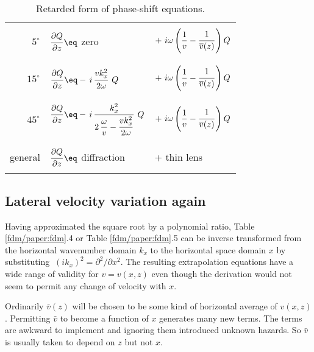 {\begin{table}
\begin{center}
\begin{tabular}{|r|ll|}
     &     &  \\
$5^\circ$ & $\displaystyle {\strut\partial Q\over
             \partial z} \eq $ zero
& $+\ i\omega \left( \displaystyle {1\over v} - 
  {\strut 1\over\overline{v}(z)} \right) Q$ \\
     &     &   \\   \hline
     &     &   \\
$15^\circ$ & $\displaystyle {\strut\partial Q\over
             \partial z} \eq - \,i\, {\displaystyle 
             {\strut v k_x^2\over 2\omega}} \ Q$ 
& $+\ i\omega \left( \displaystyle {1\over v} - 
  {\strut 1\over\overline{v}(z)} \right) Q$    \\
     &     &   \\      \hline
     &     &   \\
$45^\circ$ & $\displaystyle {\strut\partial Q\over
             \partial z} \eq - \,i\, {\displaystyle 
             {\strut k_x^2}\over\displaystyle 
             {2\,{\omega\over v} - {\strut v k_x^2
             \over 2\omega}}} \ Q$ 
& $+\ i\omega \left(\displaystyle {1\over v} - 
  {\strut 1\over\overline{v}(z)} \right) Q$ \\
     &     &   \\       \hline
     &     &   \\       
{\rm general} & $\displaystyle {\strut\partial Q\over
                \partial z} \eq $ {\rm diffraction} 
 & + {\rm thin lens} \\
     &     &   \\       \hline
\end{tabular}
\end{center}
\label{eqn:1-4}
\caption{Retarded form of phase-shift equations.}
\end{table}
\subsection{Lateral velocity variation again}
\par
Having approximated the square root by a polynomial ratio,
Table \ref{fdm/paper:fdm}.4 or Table \ref{fdm/paper:fdm}.5 can be inverse transformed
from the horizontal wavenumber domain  $ k_x $  to the
horizontal space domain  $x$  by substituting
$ \  (ik_x )^2  =  \partial^2 / \partial x^2$.
The resulting extrapolation equations have a 
wide range of validity for  $v = v(x,z)$  even though the
derivation would not seem to permit any change of velocity with $x$.
\par
Ordinarily $\bar v(z)$ will be chosen
to be some kind of horizontal average of $v(x,z)$.
Permitting $\bar v$ to become a function of $x$ generates many
new terms.
The terms are awkward to implement and ignoring them introduced
unknown hazards.
So $\bar v$ is usually taken to depend on $z$ but not $x$.
}
